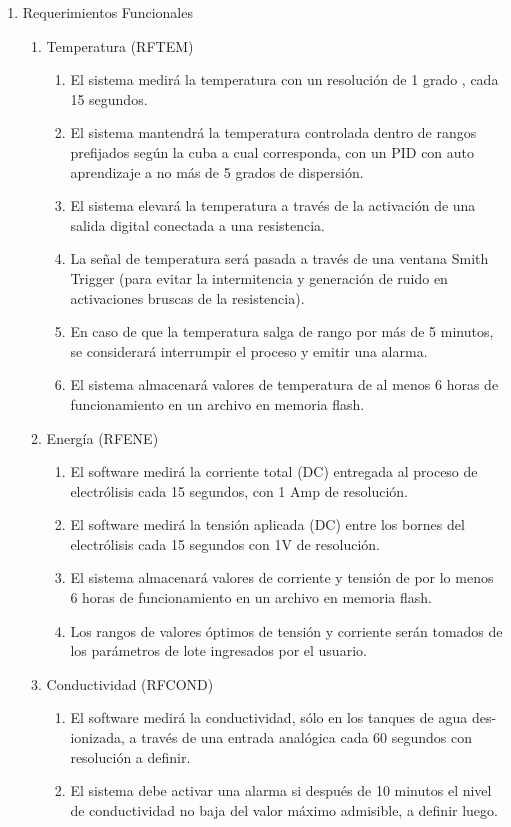 \begin{enumerate}
\item Requerimientos Funcionales
\begin{enumerate}

\item Temperatura (RFTEM)
\begin{enumerate}
\item El sistema medirá la temperatura con un resolución de 1 grado , cada 15 segundos.
\item El sistema mantendrá la temperatura controlada dentro de rangos prefijados según la cuba a cual corresponda, con un PID con auto aprendizaje a no más de 5 grados de dispersión.
\item El sistema elevará la temperatura a través de la activación de una salida digital conectada a una resistencia.
\item La señal de temperatura será pasada a través de una ventana Smith Trigger (para evitar la intermitencia y generación de ruido en activaciones bruscas de la resistencia).
\item En caso de que la temperatura salga de rango por más de 5 minutos, se considerará interrumpir el proceso y emitir una alarma.
\item El sistema almacenará valores de temperatura de al menos 6 horas de funcionamiento en un archivo en memoria flash.
\end{enumerate}

\item Energía (RFENE)
\begin{enumerate}
\item El software medirá la corriente total (DC) entregada al proceso de electrólisis cada 15 segundos, con 1 Amp de resolución.
\item El software medirá la tensión aplicada (DC) entre los bornes del electrólisis cada 15 segundos con 1V de resolución.
\item El sistema almacenará valores de corriente y tensión de por lo menos 6 horas de funcionamiento en un archivo en memoria flash.
\item Los rangos de valores óptimos de tensión y corriente serán tomados de los parámetros de lote ingresados por el usuario.
\end{enumerate}

\item Conductividad (RFCOND)
\begin{enumerate}
\item El software medirá la conductividad, sólo en los tanques de agua des-ionizada, a través de una entrada analógica cada 60 segundos con resolución a definir.
\item El sistema debe activar una alarma si después de 10 minutos el nivel de conductividad no baja del valor máximo admisible, a definir luego.
\end{enumerate}


\end{enumerate}
\end{enumerate}
